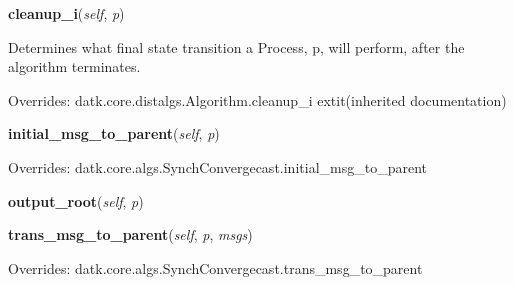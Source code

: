     \vspace{0.5ex}

\hspace{.8\funcindent}\begin{boxedminipage}{\funcwidth}

    \raggedright \textbf{cleanup\_i}(\textit{self}, \textit{p})

\setlength{\parskip}{2ex}
    Determines what final state transition a Process, p, will perform, 
    after the algorithm terminates.

\setlength{\parskip}{1ex}
      Overrides: datk.core.distalgs.Algorithm.cleanup\_i 	extit{(inherited documentation)}

    \end{boxedminipage}

    \vspace{0.5ex}

\hspace{.8\funcindent}\begin{boxedminipage}{\funcwidth}

    \raggedright \textbf{initial\_msg\_to\_parent}(\textit{self}, \textit{p})

\setlength{\parskip}{2ex}
\setlength{\parskip}{1ex}
      Overrides: datk.core.algs.SynchConvergecast.initial\_msg\_to\_parent

    \end{boxedminipage}

    \label{datk:core:algs:SynchConvergeHeight:output_root}

    \vspace{0.5ex}

\hspace{.8\funcindent}\begin{boxedminipage}{\funcwidth}

    \raggedright \textbf{output\_root}(\textit{self}, \textit{p})

\setlength{\parskip}{2ex}
\setlength{\parskip}{1ex}
    \end{boxedminipage}

    \vspace{0.5ex}

\hspace{.8\funcindent}\begin{boxedminipage}{\funcwidth}

    \raggedright \textbf{trans\_msg\_to\_parent}(\textit{self}, \textit{p}, \textit{msgs})

\setlength{\parskip}{2ex}
\setlength{\parskip}{1ex}
      Overrides: datk.core.algs.SynchConvergecast.trans\_msg\_to\_parent

    \end{boxedminipage}


